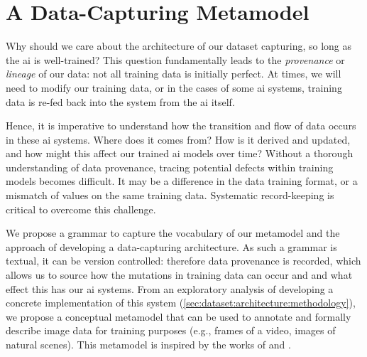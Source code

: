 \section{A Data-Capturing Metamodel}
\label{sec:dataset:architecture}

Why should we care about the architecture of our dataset capturing, so long as the \gls{ai} is well-trained? This question fundamentally leads to the \textit{provenance} or \textit{lineage} of our data: not all training data is initially perfect. At times, we will need to modify our training data, or in the cases of some \gls{ai} systems, training data is re-fed back into the system from the \gls{ai} itself. 

Hence, it is imperative to understand how the transition and flow of data occurs \citep{Cui:2003im,Ikeda:2009ca,Buneman:2000bn} in these \gls{ai} systems. Where does it comes from? How is it derived and updated, and how might this affect our trained \gls{ai} models over time? Without a thorough understanding of data provenance, tracing potential defects within training models becomes difficult. It may be a difference in the data training format, or a mismatch of values on the same training data. Systematic record-keeping is critical to overcome this challenge.

We propose a grammar to capture the vocabulary of our metamodel and the approach of developing a data-capturing architecture. As such a grammar is textual, it can be version controlled: therefore data provenance is recorded, which allows us to source how the mutations in training data can occur and and what effect this has our \gls{ai} systems. From an exploratory analysis of developing a concrete implementation of this system (\cref{sec:dataset:architecture:methodology}), we propose a conceptual metamodel that can be used to annotate and formally describe image data for training purposes (e.g., frames of a video, images of natural scenes). This metamodel is inspired by the works of \citet{Wickham:2010hy, Wickham:2007tu} and \citet{Moody:2009vo}.





